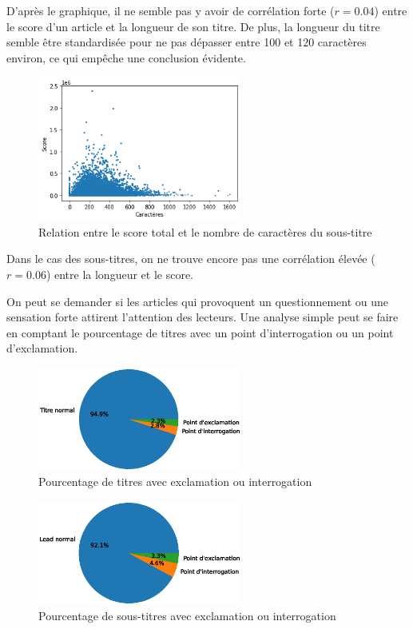 \documentclass[french]{article}
\begin{document}
D'après le graphique, il ne semble pas y avoir de corrélation forte ($r = 0.04$) entre le score d'un article et la longueur de son titre. De plus, la longueur du titre semble être standardisée pour ne pas dépasser entre 100 et 120 caractères environ, ce qui empêche une conclusion évidente.

\begin{figure}[H]
    \centering
    \includegraphics[width=0.6\textwidth]{dot_lead_length_score_relation.png}
    \caption{Relation entre le score total et le nombre de caractères du sous-titre}
    \label{fig:dot_lead_length_score_relation}
\end{figure}

Dans le cas des sous-titres, on ne trouve encore pas une corrélation élevée ($r = 0.06$) entre la longueur et le score.

On peut se demander si les articles qui provoquent un questionnement ou une sensation forte attirent l'attention des lecteurs. Une analyse simple peut se faire en comptant le pourcentage de titres avec un point d'interrogation ou un point d'exclamation.

\begin{figure}[H]
    \centering
    \includegraphics[width=0.6\textwidth]{pie_titres_avec_ponctuation.eps}
    \caption{Pourcentage de titres avec exclamation ou interrogation}
    \label{fig:pie_titres_avec_ponctuation}
    \end{figure}

\begin{figure}[H]
    \centering
    \includegraphics[width=0.6\textwidth]{pie_leads_avec_ponctuation.eps}
    \caption{Pourcentage de sous-titres avec exclamation ou interrogation}
    \label{fig:pie_leads_avec_ponctuation}
    \end{figure}
\end{document}

